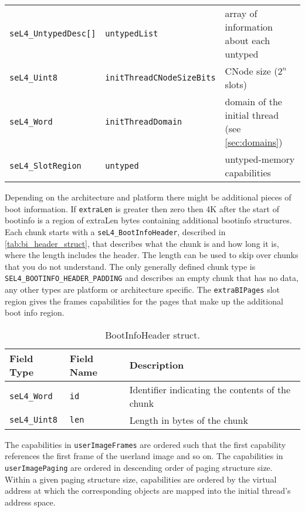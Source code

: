 \begin{table}[htb]
\begin{center}
\begin{tabularx}{\textwidth}{llX}
      \texttt{seL4\_UntypedDesc[]}  & \texttt{untypedList}             & array of information about each untyped \\
      \texttt{seL4\_Uint8}          & \texttt{initThreadCNodeSizeBits} & CNode size ($2^n$ slots) \\
      \texttt{seL4\_Word}           & \texttt{initThreadDomain}        & domain of the initial thread (see \autoref{sec:domains}) \\
      \texttt{seL4\_SlotRegion}     & \texttt{untyped}                 & untyped-memory capabilities \\
      \bottomrule
    \end{tabularx}
  \end{center}
\end{table}

Depending on the architecture and platform there might be additional pieces of boot
information. If \texttt{extraLen} is greater then zero then 4K after the start of bootinfo
is a region of extraLen bytes containing additional bootinfo structures. Each chunk starts
with a \texttt{seL4\_BootInfoHeader}, described in \autoref{tab:bi_header_struct}, that
describes what the chunk is and how long it is, where the length includes the header. The
length can be used to skip over chunks that you do not understand. The only generally
defined chunk type is \texttt{SEL4\_BOOTINFO\_HEADER\_PADDING} and describes an empty
chunk that has no data, any other types are platform or architecture specific. The
\texttt{extraBIPages} slot region gives the frames capabilities for the pages that make up
the additional boot info region.

\begin{table}[htb]
  \begin{center}
    \caption{BootInfoHeader struct.}
    \label{tab:bi_header_struct}
    \begin{tabular}{lll}
      \toprule
      Field Type & Field Name & Description \\
      \midrule
      \texttt{seL4\_Word}  & \texttt{id}  & Identifier indicating the contents of the chunk \\
      \texttt{seL4\_Uint8} & \texttt{len} & Length in bytes of the chunk \\
      \bottomrule
    \end{tabular}
  \end{center}
\end{table}

The capabilities in \texttt{userImageFrames} are
ordered such that the first capability references the first frame of the
userland image and so on.
The capabilities in \texttt{userImagePaging} are ordered in descending order
of paging structure size. Within a given paging structure size, capabilities are
ordered by the virtual address at which the corresponding objects are mapped
into the initial thread's address space.

